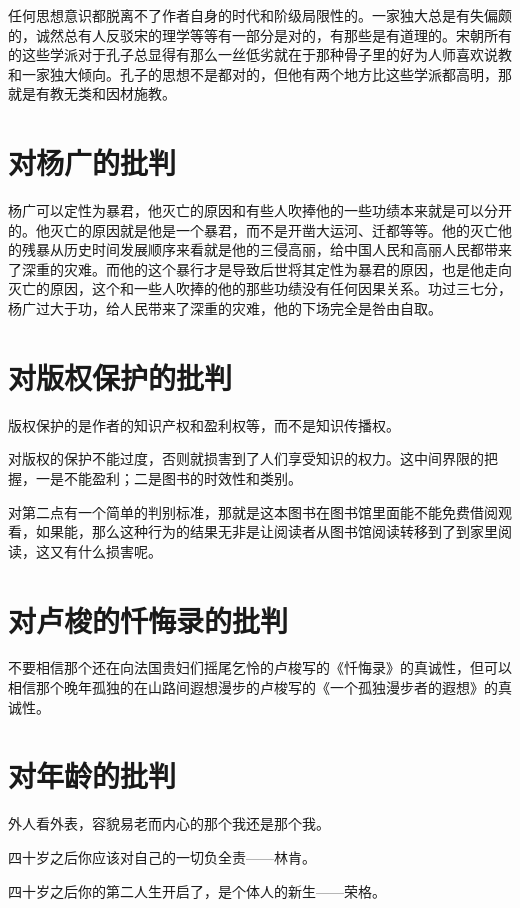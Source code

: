 \documentclass[12pt,oneside]{book}
\begin{document}
任何思想意识都脱离不了作者自身的时代和阶级局限性的。一家独大总是有失偏颇的，诚然总有人反驳宋的理学等等有一部分是对的，有那些是有道理的。宋朝所有的这些学派对于孔子总显得有那么一丝低劣就在于那种骨子里的好为人师喜欢说教和一家独大倾向。孔子的思想不是都对的，但他有两个地方比这些学派都高明，那就是有教无类和因材施教。​

\chapter{对杨广的批判}
杨广可以定性为暴君，他灭亡的原因和有些人吹捧他的一些功绩本来就是可以分开的。他灭亡的原因就是他是一个暴君，而不是开凿大运河、迁都等等。他的灭亡他的残暴从历史时间发展顺序来看就是他的三侵高丽，给中国人民和高丽人民都带来了深重的灾难。而他的这个暴行才是导致后世将其定性为暴君的原因，也是他走向灭亡的原因，这个和一些人吹捧的他的那些功绩没有任何因果关系。功过三七分，杨广过大于功，给人民带来了深重的灾难，他的下场完全是咎由自取。

\chapter{对版权保护的批判}
版权保护的是作者的知识产权和盈利权等，而不是知识传播权。

对版权的保护不能过度，否则就损害到了人们享受知识的权力。这中间界限的把握，一是不能盈利；二是图书的时效性和类别。

对第二点有一个简单的判别标准，那就是这本图书在图书馆里面能不能免费借阅观看，如果能，那么这种行为的结果无非是让阅读者从图书馆阅读转移到了到家里阅读，这又有什么损害呢。




\chapter{对卢梭的忏悔录的批判}
不要相信那个还在向法国贵妇们摇尾乞怜的卢梭写的《忏悔录》的真诚性，但可以相信那个晚年孤独的在山路间遐想漫步的卢梭写的《一个孤独漫步者的遐想》的真诚性。

\chapter{对年龄的批判}
外人看外表，容貌易老而内心的那个我还是那个我。

四十岁之后你应该对自己的一切负全责——林肯。

四十岁之后你的第二人生开启了，是个体人的新生——荣格。
\end{document}
